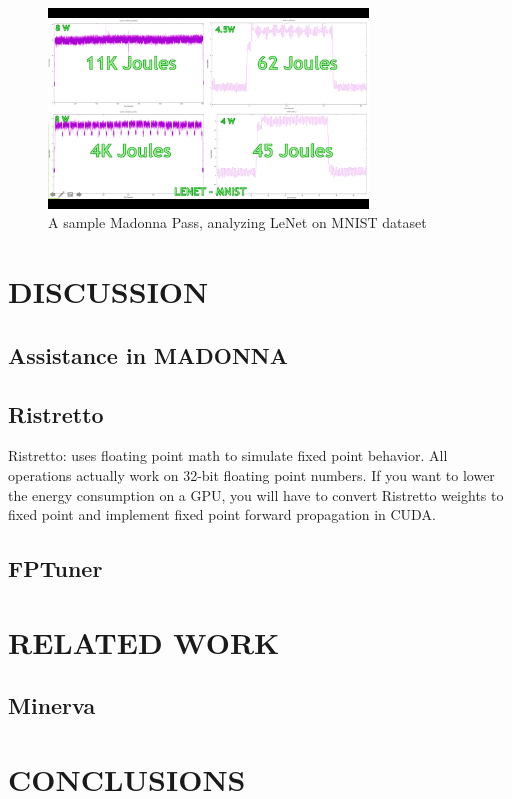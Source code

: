\documentclass[letterpaper, 10 pt, conference]{ieeeconf}
\begin{document}
          \begin{figure}[h]
              \centering
              \includegraphics[width=85mm,scale=1]{lenet.png}
              \caption{A sample Madonna Pass, analyzing LeNet on MNIST dataset}
              \label{lenet}
          \end{figure}


\section{DISCUSSION}

\subsection{Assistance in MADONNA}

\subsection{Ristretto} Ristretto: uses floating point math to simulate fixed point behavior. 
All operations actually work on 32-bit floating point numbers.
If you want to lower the energy consumption on a GPU, you will have to convert Ristretto weights to fixed point and implement fixed point forward propagation in CUDA.

\subsection{FPTuner}

\section{RELATED WORK}

\subsection{Minerva}

\section{CONCLUSIONS}
\end{document}
